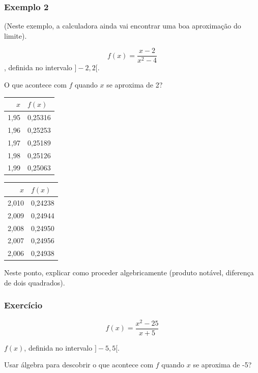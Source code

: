 \documentclass[a4paper]{article}
\begin{document}
\subsubsection{Exemplo 2}

(Neste exemplo, a calculadora ainda vai encontrar uma boa aproximação do limite).

\begin{displaymath}
  f(x) = \frac{x-2}{x^2 - 4}
\end{displaymath}, definida no intervalo $]-2,2[$.

O que acontece com $f$ quando $x$ se aproxima de 2?

\begin{multicols}{2}
\begin{tabular}[h]{r|l}
  $x$ & $f(x)$\\
  \hline
1,95 & 0,25316\\
  \hline
1,96 & 0,25253\\
  \hline
1,97 & 0,25189\\
  \hline
1,98 & 0,25126\\
\hline
1,99 & 0,25063\\
\end{tabular}


\begin{tabular}[h]{r|l}
  $x$ & $f(x)$\\
  \hline
2,010 & 0,24238\\
  \hline
2,009 & 0,24944\\
  \hline
2,008 & 0,24950\\
  \hline
2,007 & 0,24956\\
  \hline
2,006 & 0,24938\\
\end{tabular}

\end{multicols}

Neste ponto, explicar como proceder algebricamente (produto notável, diferença de dois quadrados).

\subsubsection{Exercício}

\begin{displaymath}
  f(x) = \frac{x^2-25}{x + 5}
\end{displaymath}

$f(x)$, definida no intervalo $]-5,5[$.

Usar álgebra para descobrir o que acontece com $f$ quando $x$ se aproxima de -5?
\end{document}
